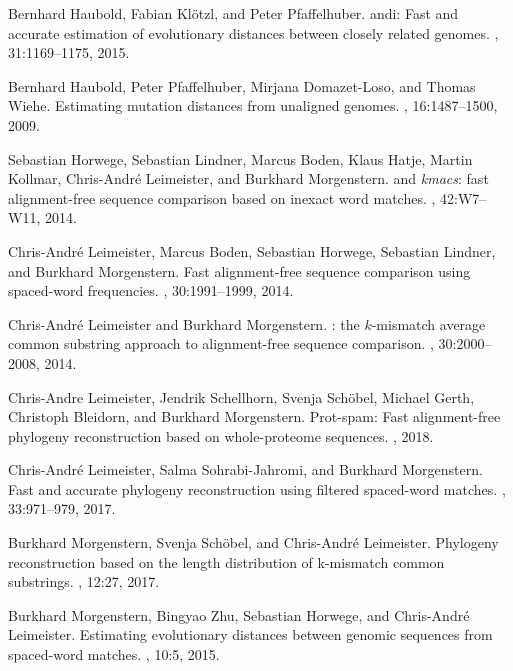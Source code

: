 \documentclass[review]{elsarticle}
\begin{document}
{\begin{thebibliography}{10}
Bernhard Haubold, Fabian Kl{\"o}tzl, and Peter Pfaffelhuber.
\newblock andi: Fast and accurate estimation of evolutionary distances between
  closely related genomes.
, 31:1169--1175, 2015.

Bernhard Haubold, Peter Pfaffelhuber, Mirjana Domazet-Loso, and Thomas Wiehe.
\newblock Estimating mutation distances from unaligned genomes.
, 16:1487--1500, 2009.

Sebastian Horwege, Sebastian Lindner, Marcus Boden, Klaus Hatje, Martin
  Kollmar, Chris-Andr\'{e} Leimeister, and Burkhard Morgenstern.
 and {\it kmacs}: fast alignment-free sequence
  comparison based on inexact word matches.
, 42:W7--W11, 2014.

Chris-Andr{\'e} Leimeister, Marcus Boden, Sebastian Horwege, Sebastian Lindner,
  and Burkhard Morgenstern.
\newblock Fast alignment-free sequence comparison using spaced-word
  frequencies.
, 30:1991--1999, 2014.

Chris-Andr{\'e} Leimeister and Burkhard Morgenstern.
: the $k$-mismatch average common substring approach to
  alignment-free sequence comparison.
, 30:2000--2008, 2014.

Chris-Andre Leimeister, Jendrik Schellhorn, Svenja Sch{\"o}bel, Michael Gerth,
  Christoph Bleidorn, and Burkhard Morgenstern.
\newblock Prot-spam: Fast alignment-free phylogeny reconstruction based on
  whole-proteome sequences.
, 2018.

Chris-Andr{\'e} Leimeister, Salma Sohrabi-Jahromi, and Burkhard Morgenstern.
\newblock Fast and accurate phylogeny reconstruction using filtered spaced-word
  matches.
, 33:971--979, 2017.

Burkhard Morgenstern, Svenja Sch{\"o}bel, and Chris-Andr{\'e} Leimeister.
\newblock Phylogeny reconstruction based on the length distribution of
  k-mismatch common substrings.
, 12:27, 2017.

Burkhard Morgenstern, Bingyao Zhu, Sebastian Horwege, and Chris-Andr{\'e}
  Leimeister.
\newblock Estimating evolutionary distances between genomic sequences from
  spaced-word matches.
, 10:5, 2015.


\end{thebibliography}}
\end{document}
